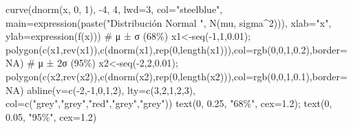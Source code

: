 \documentclass[
  letterpaper,
  DIV=11,
  numbers=noendperiod]{scrartcl}
\newenvironment{Shaded}{\begin{snugshade}}{\end{snugshade}}
\newcommand{\AttributeTok}[1]{\textcolor[rgb]{0.40,0.45,0.13}{#1}}
\newcommand{\CommentTok}[1]{\textcolor[rgb]{0.37,0.37,0.37}{#1}}
\newcommand{\ConstantTok}[1]{\textcolor[rgb]{0.56,0.35,0.01}{#1}}
\newcommand{\DecValTok}[1]{\textcolor[rgb]{0.68,0.00,0.00}{#1}}
\newcommand{\FloatTok}[1]{\textcolor[rgb]{0.68,0.00,0.00}{#1}}
\newcommand{\FunctionTok}[1]{\textcolor[rgb]{0.28,0.35,0.67}{#1}}
\newcommand{\NormalTok}[1]{\textcolor[rgb]{0.00,0.23,0.31}{#1}}
\newcommand{\OtherTok}[1]{\textcolor[rgb]{0.00,0.23,0.31}{#1}}
\newcommand{\SpecialCharTok}[1]{\textcolor[rgb]{0.37,0.37,0.37}{#1}}
\newcommand{\StringTok}[1]{\textcolor[rgb]{0.13,0.47,0.30}{#1}}
\begin{document}
\begin{Shaded}
\begin{Highlighting}[]
\FunctionTok{curve}\NormalTok{(}\FunctionTok{dnorm}\NormalTok{(x, }\DecValTok{0}\NormalTok{, }\DecValTok{1}\NormalTok{), }\SpecialCharTok{{-}}\DecValTok{4}\NormalTok{, }\DecValTok{4}\NormalTok{, }\AttributeTok{lwd=}\DecValTok{3}\NormalTok{, }\AttributeTok{col=}\StringTok{"steelblue"}\NormalTok{,}
      \AttributeTok{main=}\FunctionTok{expression}\NormalTok{(}\FunctionTok{paste}\NormalTok{(}\StringTok{"Distribución Normal "}\NormalTok{, }\FunctionTok{N}\NormalTok{(mu, sigma}\SpecialCharTok{\^{}}\DecValTok{2}\NormalTok{))),}
      \AttributeTok{xlab=}\StringTok{"x"}\NormalTok{, }\AttributeTok{ylab=}\FunctionTok{expression}\NormalTok{(}\FunctionTok{f}\NormalTok{(x)))}
\CommentTok{\# μ ± σ (68\%)}
\NormalTok{x1}\OtherTok{\textless{}{-}}\FunctionTok{seq}\NormalTok{(}\SpecialCharTok{{-}}\DecValTok{1}\NormalTok{,}\DecValTok{1}\NormalTok{,}\FloatTok{0.01}\NormalTok{); }\FunctionTok{polygon}\NormalTok{(}\FunctionTok{c}\NormalTok{(x1,}\FunctionTok{rev}\NormalTok{(x1)),}\FunctionTok{c}\NormalTok{(}\FunctionTok{dnorm}\NormalTok{(x1),}\FunctionTok{rep}\NormalTok{(}\DecValTok{0}\NormalTok{,}\FunctionTok{length}\NormalTok{(x1))),}\AttributeTok{col=}\FunctionTok{rgb}\NormalTok{(}\DecValTok{0}\NormalTok{,}\DecValTok{0}\NormalTok{,}\DecValTok{1}\NormalTok{,}\FloatTok{0.2}\NormalTok{),}\AttributeTok{border=}\ConstantTok{NA}\NormalTok{)}
\CommentTok{\# μ ± 2σ (95\%)}
\NormalTok{x2}\OtherTok{\textless{}{-}}\FunctionTok{seq}\NormalTok{(}\SpecialCharTok{{-}}\DecValTok{2}\NormalTok{,}\DecValTok{2}\NormalTok{,}\FloatTok{0.01}\NormalTok{); }\FunctionTok{polygon}\NormalTok{(}\FunctionTok{c}\NormalTok{(x2,}\FunctionTok{rev}\NormalTok{(x2)),}\FunctionTok{c}\NormalTok{(}\FunctionTok{dnorm}\NormalTok{(x2),}\FunctionTok{rep}\NormalTok{(}\DecValTok{0}\NormalTok{,}\FunctionTok{length}\NormalTok{(x2))),}\AttributeTok{col=}\FunctionTok{rgb}\NormalTok{(}\DecValTok{0}\NormalTok{,}\DecValTok{0}\NormalTok{,}\DecValTok{1}\NormalTok{,}\FloatTok{0.1}\NormalTok{),}\AttributeTok{border=}\ConstantTok{NA}\NormalTok{)}
\FunctionTok{abline}\NormalTok{(}\AttributeTok{v=}\FunctionTok{c}\NormalTok{(}\SpecialCharTok{{-}}\DecValTok{2}\NormalTok{,}\SpecialCharTok{{-}}\DecValTok{1}\NormalTok{,}\DecValTok{0}\NormalTok{,}\DecValTok{1}\NormalTok{,}\DecValTok{2}\NormalTok{), }\AttributeTok{lty=}\FunctionTok{c}\NormalTok{(}\DecValTok{3}\NormalTok{,}\DecValTok{2}\NormalTok{,}\DecValTok{1}\NormalTok{,}\DecValTok{2}\NormalTok{,}\DecValTok{3}\NormalTok{), }\AttributeTok{col=}\FunctionTok{c}\NormalTok{(}\StringTok{"grey"}\NormalTok{,}\StringTok{"grey"}\NormalTok{,}\StringTok{"red"}\NormalTok{,}\StringTok{"grey"}\NormalTok{,}\StringTok{"grey"}\NormalTok{))}
\FunctionTok{text}\NormalTok{(}\DecValTok{0}\NormalTok{, }\FloatTok{0.25}\NormalTok{, }\StringTok{"68\%"}\NormalTok{, }\AttributeTok{cex=}\FloatTok{1.2}\NormalTok{); }\FunctionTok{text}\NormalTok{(}\DecValTok{0}\NormalTok{, }\FloatTok{0.05}\NormalTok{, }\StringTok{"95\%"}\NormalTok{, }\AttributeTok{cex=}\FloatTok{1.2}\NormalTok{)}
\end{Highlighting}
\end{Shaded}
\end{document}
